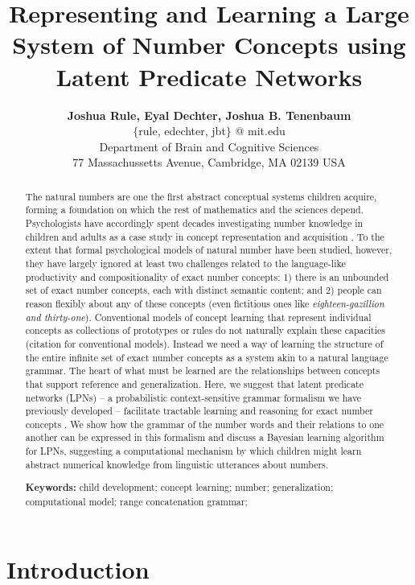 \documentclass[10pt,letterpaper]{article}
\title{Representing and Learning a Large System of Number Concepts using Latent Predicate Networks}
\author{{\large \bf Joshua Rule, Eyal Dechter, Joshua B. Tenenbaum} \\
  $\{$rule, edechter, jbt$\}$ @ mit.edu \\
  Department of Brain and Cognitive Sciences\\
  77 Massachussetts Avenue, Cambridge, MA 02139 USA}
\begin{document}
\maketitle

\begin{abstract}
  The natural numbers are one the first abstract conceptual systems
  children acquire, forming a foundation on which the rest of
  mathematics and the sciences depend. Psychologists have accordingly
  spent decades investigating number knowledge in children and adults
  as a case study in concept representation and acquisition
  \citep[{\it e.g.}][]{Car2009}. To the extent that formal
  psychological models of natural number have been studied, however,
  they have largely ignored at least two challenges related to the
  language-like productivity and compositionality of exact number
  concepts: 1) there is an unbounded set of exact number concepts,
  each with distinct semantic content; and 2) people can reason
  flexibly about any of these concepts (even fictitious ones like
  \emph{eighteen-gazillion and thirty-one}). Conventional models of
  concept learning that represent individual concepts as collections
  of prototypes or rules do not naturally explain these capacities
  (citation for conventional models). Instead we need a way of
  learning the structure of the entire infinite set of exact number
  concepts as a system akin to a natural language grammar. The heart
  of what must be learned are the relationships between concepts that
  support reference and generalization. Here, we suggest that latent
  predicate networks (LPNs) -- a probabilistic context-sensitive
  grammar formalism we have previously developed -- facilitate
  tractable learning and reasoning for exact number concepts
  \citep{DecRulTenming}. We show how the grammar of the number words and
  their relations to one another can be expressed in this formalism
  and discuss a Bayesian learning algorithm for LPNs, suggesting a
  computational mechanism by which children might learn abstract
  numerical knowledge from linguistic utterances about numbers.

  \textbf{Keywords:}
  child development; concept learning; number; generalization;
  computational model; range concatenation grammar;
\end{abstract}

\section{Introduction}
\end{document}
